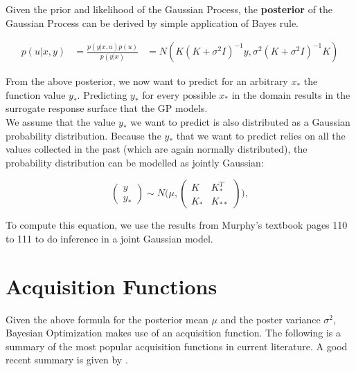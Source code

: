 
Given the prior and likelihood of the Gaussian Process, the \textbf{posterior} of the Gaussian Process can be derived by simple application of Bayes rule.

\begin{align}
p(u | x, y) &= \frac{ p(y | x, u) p(u) }{p(y | x)}
& = N( K(K +\sigma^2 I)^{-1}y, \sigma^2 (K + \sigma^2 I)^{-1} K )
\end{align}

From the above posterior, we now want to predict for an arbitrary $x_*$ the function value $y_*$.
Predicting $y_*$ for every possible $x_*$ in the domain results in the surrogate response surface that the GP models. \\

We assume that the value $y_*$ we want to predict is also distributed as a Gaussian probability distribution. 
Because the $y_*$ that we want to predict relies on all the values collected in the past (which are again normally distributed), the probability distribution can be modelled as jointly Gaussian:

\begin{equation}
\begin{pmatrix} y \\
y_* \end{pmatrix} \sim N\Biggl(\mu,\begin{pmatrix} K & K^T_*\\
 K_* & K_{**} \end{pmatrix}\Biggr),
\end{equation}

To compute this equation, we use the results from Murphy's textbook \citep{Murphy} pages 110 to 111 to do inference in a joint Gaussian model.

\section{Acquisition Functions}

Given the above formula for the posterior mean $\mu$ and the poster variance $\sigma^2$, Bayesian Optimization makes use of an acquisition function.
The following is a summary of the most popular acquisition functions in current literature.
A good recent summary is given by \citep{AcquisitionFunctionsMaximizing}.


